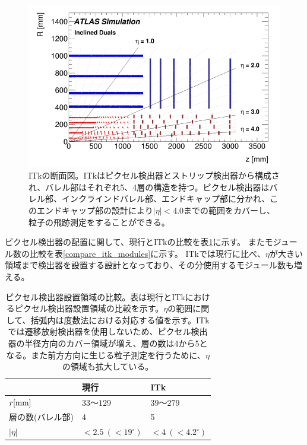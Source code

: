 \begin{figure}[bpt]\centering
\includegraphics[width=12cm]{./itk_cross_section.png}
\caption[ITkの断面図]{ITkの断面図\cite{1-3}。ITkはピクセル検出器とストリップ検出器から構成され、バレル部はそれぞれ5、4層の構造を持つ。ピクセル検出器はバレル部、インクラインドバレル部、エンドキャップ部に分かれ、このエンドキャップ部の設計により$|\eta|<4.0$までの範囲をカバーし、粒子の飛跡測定をすることができる。}
\label{itk_cross_section}
\end{figure}

ピクセル検出器の配置に関して、現行とITkの比較を表\ref{compare_itk_pixel}に示す。
またモジュール数の比較を表\ref{compare_itk_modules}に示す。
ITkでは現行に比べ、$\eta$が大きい領域まで検出器を設置する設計となっており、その分使用するモジュール数も増える。

\begin{table}[tbp]
\begin{center}
\caption[ピクセル検出器設置領域の比較]{ピクセル検出器設置領域の比較。表は現行とITkにおけるピクセル検出器設置領域の比較を示す。$\eta$の範囲に関して、括弧内は度数法における対応する値を示す。ITkでは遷移放射検出器を使用しないため、ピクセル検出器の半径方向のカバー領域が増え、層の数は4から5となる。また前方方向に生じる粒子測定を行うために、$\eta$の領域も拡大している。}
\label{compare_itk_pixel}
  \begin{tabular}{|lll|} \hline
    & 現行 & ITk \\ \hline
    $r[\rm{mm}]$ & $33〜129$ & $39〜279$ \\ 
    層の数(バレル部) & 4 & 5 \\ 
    $|\eta|$ & $<2.5~(<19^\circ)$ & $<4~(<4.2^\circ)$ \\ \hline
  \end{tabular}
\end{center}
\end{table}

